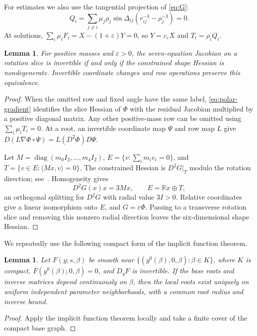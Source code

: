 \documentclass[11pt,a4paper]{article}
\numberwithin{equation}{section}
\newtheorem{lemma}[theorem]{Lemma}
\theoremstyle{remark}
\newcommand{\R}{\mathbb R}
\newcommand{\eps}{\varepsilon}
\newcommand{\diag}{\operatorname{diag}}
\newcommand{\ip}[2]{\langle #1,#2\rangle}
\begin{document}
For estimates we also use the tangential projection of \eqref{eq:G}:
\begin{equation}\label{eq:Q}
 Q_i=\sum_{j\ne i}\mu_j\rho_j\sin\Delta_{ij}
       (r_{ij}^{-3}-\rho_j^{-3})=0.
\end{equation}
At solutions, $\sum_i\mu_iF_i=X-(1+\eps)Y=0$, so $Y=c_\eps X$ and
$T_i=\rho_iQ_i$.

\begin{lemma}\label{lem:hessian}
For positive masses and $\eps>0$, the seven-equation Jacobian on a rotation slice is invertible if and only if the constrained shape Hessian is nondegenerate. Invertible coordinate changes and row operations preserve this equivalence.
\end{lemma}
\begin{proof}
When the omitted row and fixed angle have the same label, \eqref{eq:polar-gradient} identifies the slice Hessian of $\Phi$ with the residual Jacobian multiplied by a positive diagonal matrix. Any other positive-mass row can be omitted using $\sum_i\mu_iT_i=0$. At a root, an invertible coordinate map $\Psi$ and row map $L$ give
$D(L\nabla\Phi\circ\Psi)=L(D^2\Phi)D\Psi$.

Let $M=\diag(m_0I_2,\ldots,m_4I_2)$,
$E=\{v:\sum_i m_iv_i=0\}$, and $T=\{v\in E:\ip{Mx}{v}=0\}$.
The constrained Hessian is $D^2G|_T$ modulo the rotation direction; see~\cite{MoeckelCC}. Homogeneity gives
\[
 D^2G(x)x=3Mx,\qquad E=\R x\oplus T,
\]
an orthogonal splitting for $D^2G$ with radial value $3I>0$.
Relative coordinates give a linear isomorphism onto $E$, and $G=\eps\Phi$.
Passing to a transverse rotation slice and removing this nonzero radial direction leaves the six-dimensional shape Hessian.
\end{proof}

We repeatedly use the following compact form of the implicit function theorem.

\begin{lemma}\label{lem:product}
Let $F(y;s,\beta)$ be smooth near
$\{(y^0(\beta),0,\beta):\beta\in K\}$, where $K$ is compact,
$F(y^0(\beta);0,\beta)=0$, and $D_yF$ is invertible.
If the base roots and inverse matrices depend continuously on $\beta$, then the local roots exist uniquely on uniform independent parameter neighborhoods, with a common root radius and inverse bound.
\end{lemma}
\begin{proof}
Apply the implicit function theorem locally and take a finite cover of the compact base graph.
\end{proof}
\end{document}
